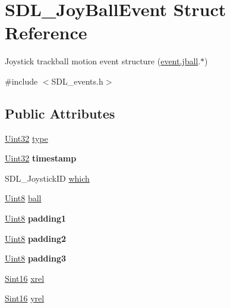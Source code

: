 \hypertarget{struct_s_d_l___joy_ball_event}{}\section{S\+D\+L\+\_\+\+Joy\+Ball\+Event Struct Reference}
\label{struct_s_d_l___joy_ball_event}


Joystick trackball motion event structure (\hyperlink{union_s_d_l___event_ae433f511e3383d17f8fe02df745ee8f8}{event.\+jball}.$\ast$)  




{\ttfamily \#include $<$S\+D\+L\+\_\+events.\+h$>$}

\subsection*{Public Attributes}
\begin{DoxyCompactItemize}
\item 
\hyperlink{_s_d_l__stdinc_8h_add440eff171ea5f55cb00c4a9ab8672d}{Uint32} \hyperlink{struct_s_d_l___joy_ball_event_a0b192b95a043cb494b27ed9b27e84db1}{type}
\item 
\hypertarget{struct_s_d_l___joy_ball_event_aa8e4fb91af62e316bb9a3219ab76148d}{}\hyperlink{_s_d_l__stdinc_8h_add440eff171ea5f55cb00c4a9ab8672d}{Uint32} {\bfseries timestamp}\label{struct_s_d_l___joy_ball_event_aa8e4fb91af62e316bb9a3219ab76148d}

\item 
S\+D\+L\+\_\+\+Joystick\+I\+D \hyperlink{struct_s_d_l___joy_ball_event_a4e2e185717d529167cd0bea21093c454}{which}
\item 
\hyperlink{_s_d_l__stdinc_8h_a2944638813a090aa23e62f4da842c3e2}{Uint8} \hyperlink{struct_s_d_l___joy_ball_event_add4eb0daeaf95ae56e8c7cfcec560242}{ball}
\item 
\hypertarget{struct_s_d_l___joy_ball_event_aff75a6519ca2a19cffdc14ebf4626613}{}\hyperlink{_s_d_l__stdinc_8h_a2944638813a090aa23e62f4da842c3e2}{Uint8} {\bfseries padding1}\label{struct_s_d_l___joy_ball_event_aff75a6519ca2a19cffdc14ebf4626613}

\item 
\hypertarget{struct_s_d_l___joy_ball_event_a0ea3071b99ac096b0157714f01ff04f8}{}\hyperlink{_s_d_l__stdinc_8h_a2944638813a090aa23e62f4da842c3e2}{Uint8} {\bfseries padding2}\label{struct_s_d_l___joy_ball_event_a0ea3071b99ac096b0157714f01ff04f8}

\item 
\hypertarget{struct_s_d_l___joy_ball_event_acb700712f1a4070bc114ef9d55b00640}{}\hyperlink{_s_d_l__stdinc_8h_a2944638813a090aa23e62f4da842c3e2}{Uint8} {\bfseries padding3}\label{struct_s_d_l___joy_ball_event_acb700712f1a4070bc114ef9d55b00640}

\item 
\hyperlink{_s_d_l__stdinc_8h_a9d0257032c0e146ab6121bf0122712f5}{Sint16} \hyperlink{struct_s_d_l___joy_ball_event_a959a8473aa1964e5e1778c27a9ffd261}{xrel}
\item 
\hyperlink{_s_d_l__stdinc_8h_a9d0257032c0e146ab6121bf0122712f5}{Sint16} \hyperlink{struct_s_d_l___joy_ball_event_a28ad48a9eb7a5d3ff62ccba09fcead76}{yrel}
\end{DoxyCompactItemize}



